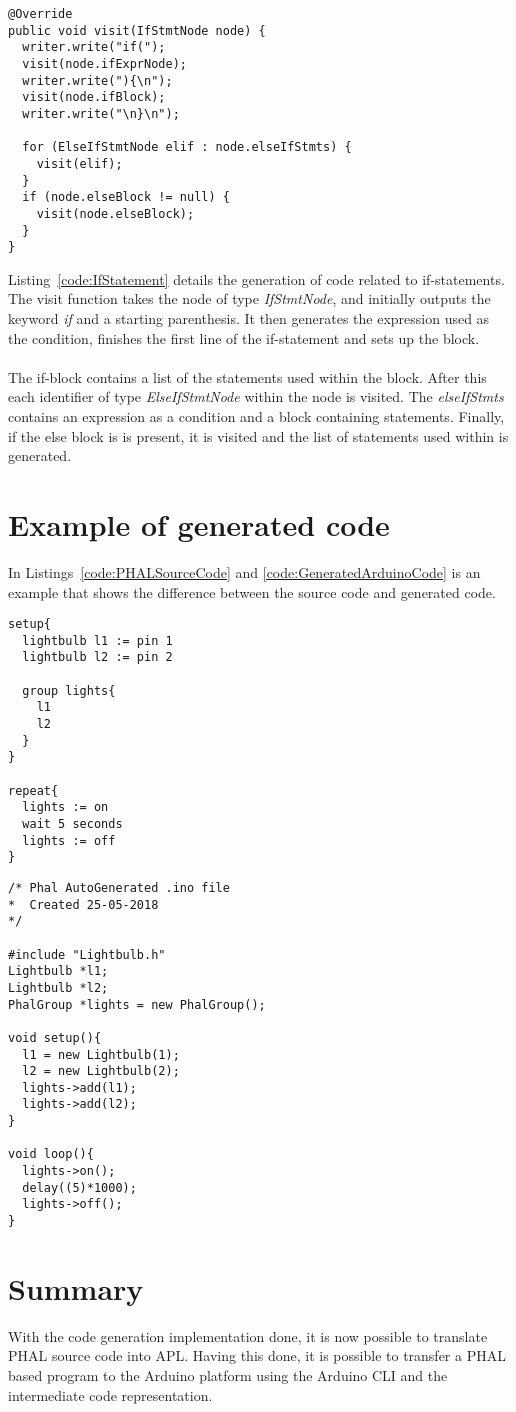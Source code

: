 \begin{lstlisting}[caption={Generating code for an if-statement}, label={code:IfStatement}]
@Override
public void visit(IfStmtNode node) {
  writer.write("if(");
  visit(node.ifExprNode);
  writer.write("){\n");
  visit(node.ifBlock);
  writer.write("\n}\n");

  for (ElseIfStmtNode elif : node.elseIfStmts) {
    visit(elif);
  }
  if (node.elseBlock != null) {
    visit(node.elseBlock);
  }
}
\end{lstlisting}
Listing~\ref{code:IfStatement} details the generation of code related to if-statements. The visit function takes the node of type \textit{IfStmtNode}, and initially outputs the keyword \textit{if} and a starting parenthesis. 
It then generates the expression used as the condition, finishes the first line of the if-statement and sets up the block. 
\\\\
The if-block contains a list of the statements used within the block. 
After this each identifier of type \textit{ElseIfStmtNode} within the node is visited. 
The \textit{elseIfStmts} contains an expression as a condition and a block containing statements. 
Finally, if the else block is is present, it is visited and the list of statements used within is generated.
\section*{Example of generated code}
In Listings~\ref{code:PHALSourceCode} and \ref{code:GeneratedArduinoCode} is an example that shows the difference between the source code and generated code.
\begin{lstlisting}[caption={Source code written in PHAL}, label={code:PHALSourceCode}]
setup{
  lightbulb l1 := pin 1
  lightbulb l2 := pin 2
  
  group lights{
    l1
    l2
  }
}

repeat{
  lights := on
  wait 5 seconds
  lights := off
}
\end{lstlisting}


\begin{lstlisting}[caption={Generated Arduino code}, label={code:GeneratedArduinoCode}]
/* Phal AutoGenerated .ino file 
*  Created 25-05-2018
*/

#include "Lightbulb.h" 
Lightbulb *l1;
Lightbulb *l2;
PhalGroup *lights = new PhalGroup();

void setup(){ 
  l1 = new Lightbulb(1);
  l2 = new Lightbulb(2);
  lights->add(l1);
  lights->add(l2);
} 

void loop(){ 
  lights->on();
  delay((5)*1000);
  lights->off();
} 
\end{lstlisting}
\section*{Summary}
With the code generation implementation done, it is now possible to translate PHAL source code into APL. Having this done, it is possible to transfer a PHAL based program to the Arduino platform using the Arduino CLI and the intermediate code representation.\\